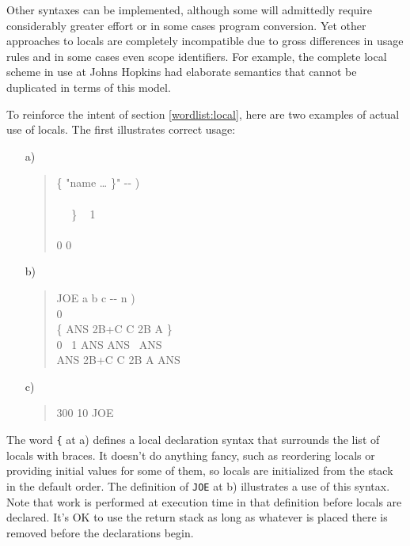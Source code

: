 \begin{intro}
Other syntaxes can be implemented, although some will admittedly
require considerably greater effort or in some cases program
conversion. Yet other approaches to locals are completely incompatible
due to gross differences in usage rules and in some cases even scope
identifiers. For example, the complete local scheme in use at Johns
Hopkins had elaborate semantics that cannot be duplicated in terms of
this model.

To reinforce the intent of section \ref{wordlist:local}, here are
two examples of actual use of locals. The first illustrates correct
usage:

\begin{enumerate}
\item[a)] \begin{quote}\ttfamily
	\word{:} \{	 "name {\ldots} \}" -{}- ) \\
	\tab {} ~   \\
	\tab~~   \word{[CHAR]} \} \word{-} ~
		 1 \word{-} ~
		  \\
	\tab~~  \\
	\tab {}  0 0 \\
	\word{;} 
	\end{quote}

\item[b)] \begin{quote}\ttfamily
	\word{:} JOE  a b c -{}- n ) \\
	\tab {}    \word{+} 0 \\
	\tab \{ ANS 2B+C C 2B A \} \\
	 0 
		~1 ANS \word{+}  \word{+}  ANS
		~ANS  
	~ \\
	\tab ANS  2B+C  C  2B  A   ANS \\
	\word{;}
	\end{quote}

\item[c)] \begin{quote} 300 10 JOE 
	\end{quote}
\end{enumerate}

The word \texttt{\{} at a) defines a local declaration syntax that
surrounds the list of locals with braces. It doesn't do anything fancy,
such as reordering locals or providing initial values for some of them,
so locals are initialized from the stack in the default order. The
definition of \texttt{JOE} at b) illustrates a use of this syntax. Note
that work is performed at execution time in that definition before
locals are declared. It's OK to use the return stack as long as whatever
is placed there is removed before the declarations begin.


\end{intro}
